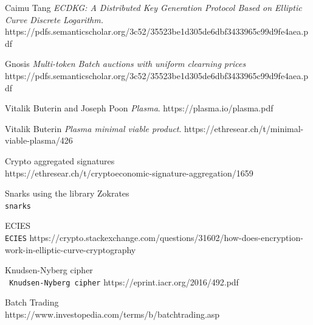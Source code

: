 \documentclass[11pt,parskip=full]{scrartcl}%
\begin{document}
\begin{thebibliography}{9}
Caimu Tang
\textit{ECDKG: A Distributed Key Generation Protocol Based on Elliptic
Curve Discrete Logarithm.}  
https://pdfs.semanticscholar.org/3c52/35523be1d305de6dbf3433965c99d9fe4aea.pdf
 

Gnosis
\textit{Multi-token Batch auctions with uniform clearning prices}  
https://pdfs.semanticscholar.org/3c52/35523be1d305de6dbf3433965c99d9fe4aea.pdf

Vitalik Buterin and Joseph Poon
\textit{Plasma}.
https://plasma.io/plasma.pdf

Vitalik Buterin
\textit{Plasma minimal viable product}.
https://ethresear.ch/t/minimal-viable-plasma/426
 
Crypto aggregated signatures
\\\texttt{}
https://ethresear.ch/t/cryptoeconomic-signature-aggregation/1659

Snarks using the library Zokrates
\\\texttt{snarks}

ECIES
\\\texttt{ECIES}
https://crypto.stackexchange.com/questions/31602/how-does-encryption-work-in-elliptic-curve-cryptography

Knudsen-Nyberg cipher
\\\texttt{ Knudsen-Nyberg cipher}
https://eprint.iacr.org/2016/492.pdf


Batch Trading
\\\texttt{}
https://www.investopedia.com/terms/b/batchtrading.asp

\end{thebibliography}
\end{document}
